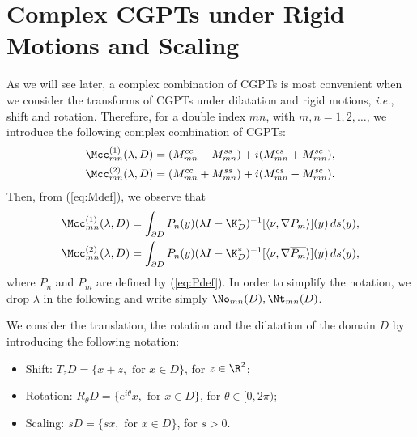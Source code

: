 \section{Complex CGPTs under Rigid Motions and Scaling}\label{sec:complex-cgpt-under}
As we will see later, a complex combination of CGPTs is most
convenient when we consider the transforms of CGPTs under
dilatation and rigid motions, \emph{i.e.}, shift and rotation.
Therefore, for a double index $mn$, with $m,n=1,2,\ldots$, we
introduce the following complex combination of CGPTs:
\begin{equation}
\begin{aligned}
\Mcc^{(1)}_{mn}(\lambda, D) &= (M^{cc}_{mn} - M^{ss}_{mn}) +
i(M^{cs}_{mn} + M^{sc}_{mn}),\\
\Mcc^{(2)}_{mn}(\lambda, D) &= (M^{cc}_{mn} + M^{ss}_{mn}) +
i(M^{cs}_{mn} - M^{sc}_{mn}).
\end{aligned}
\label{eq:Mccdef}
\end{equation}
Then, from (\ref{eq:Mdef}),  we observe that
\begin{equation*}
\begin{aligned}
\Mcc^{(1)}_{mn}(\lambda, D) &= \int_{\partial D} P_n(y)  (\lambda
I - \K^*_{D})^{-1}[\langle \nu, \nabla P_m \rangle](y)\,
ds(y),\\
\Mcc^{(2)}_{mn}(\lambda, D) &= \int_{\partial D} P_n(y)  (\lambda
I - \K^*_{D})^{-1}[\langle \nu, \nabla \overline{P_m} \rangle] (y) \, ds(y),\\
\end{aligned}
\end{equation*}
where $P_n$ and $P_m$ are defined by (\ref{eq:Pdef}). In order to
simplify the notation, we drop $\lambda$ in the following and
write simply $\No_{mn}(D), \Nt_{mn}(D)$.

We consider the translation, the rotation and the dilatation of
the domain $D$ by
 introducing the following notation:

\begin{itemize}
\item Shift: $T_zD = \{x+z, \mbox{ for } x\in D\}$, for $z \in
\R^2$; \item Rotation: $R_\theta D = \{e^{i\theta}x, \mbox{ for }
x\in D\}$, for $\theta\in[0,2\pi)$; \item Scaling: $sD=\{sx,
\mbox{ for } x\in D\}$, for $s>0$.
\end{itemize}

